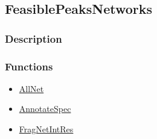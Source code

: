 \subsection{FeasiblePeaksNetworks}\label{FeasiblePeaksNetworks}
\subsubsection{Description}


\subsubsection{Functions}
\begin{itemize}
\item \hyperref[AllNet]{AllNet}
\item \hyperref[AnnotateSpec]{AnnotateSpec}
\item \hyperref[FragNetIntRes]{FragNetIntRes}
\end{itemize}

